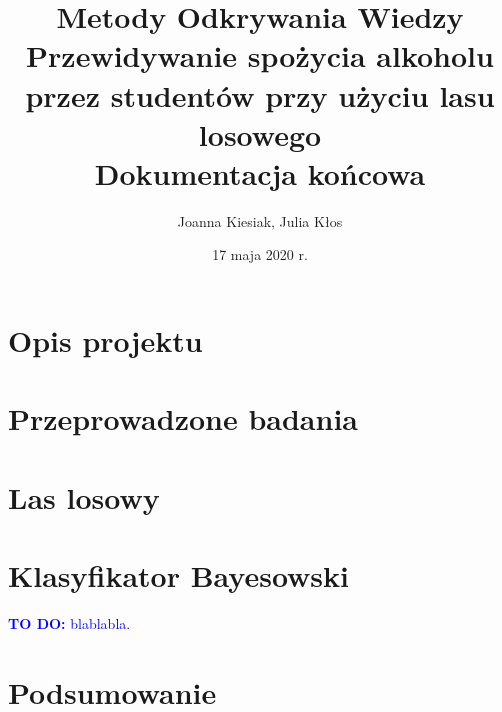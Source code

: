 \documentclass{article}
\title{{\normalfont Metody Odkrywania Wiedzy}\vspace{0.2cm} \\ 
\textbf{Przewidywanie spożycia alkoholu przez studentów przy użyciu lasu losowego}\\
\vspace{0.2cm}
\large{\normalfont Dokumentacja końcowa}}
\author{
Joanna Kiesiak, Julia Kłos\\

}
\date{17 maja 2020 r.}
\newcommand{\todo}[1]{\textcolor{blue}{\textbf{TO DO:} #1}}
\begin{document}
\maketitle



\section{Opis projektu}


\section{Przeprowadzone badania}


\section{Las losowy}


\section{Klasyfikator Bayesowski}
\todo{blablabla.}

\section{Podsumowanie}


\printbibliography

\begin{appendices}


\

\end{appendices}
\end{document}
